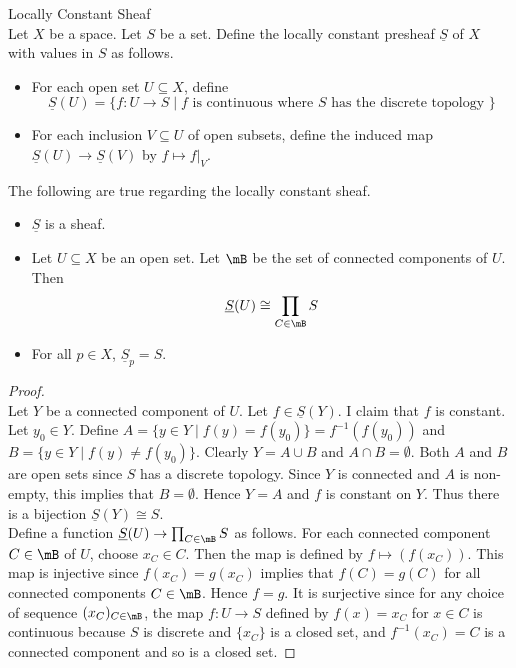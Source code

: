 \documentclass[a4paper]{article}
\begin{document}
\begin{eg}{Locally Constant Sheaf}{}\\
Let $X$ be a space. Let $S$ be a set. Define the locally constant presheaf $\underline{S}$ of $X$ with values in $S$ as follows. 
\begin{itemize}
\item For each open set $U\subseteq X$, define $$\underline{S}(U)=\{f:U\to S\;|\;f\text{ is continuous where }S\text{ has the discrete topology }\}$$
\item For each inclusion $V\subseteq U$ of open subsets, define the induced map $\underline{S}(U)\to\underline{S}(V)$ by $f\mapsto f|_V$. 
\end{itemize}
The following are true regarding the locally constant sheaf. 
\begin{itemize}
\item $\underline{S}$ is a sheaf. 
\item Let $U\subseteq X$ be an open set. Let $\mB$ be the set of connected components of $U$. Then $$\underline{S}(U)\cong\prod_{C\in\mB}S$$
\item For all $p\in X$, $\underline{S}_p=S$. 
\end{itemize}
\begin{proof}\\
Let $Y$ be a connected component of $U$. Let $f\in\underline{S}(Y)$. I claim that $f$ is constant. Let $y_0\in Y$. Define $A=\{y\in Y\;|\;f(y)=f(y_0)\}=f^{-1}(f(y_0))$ and $B=\{y\in Y\;|\;f(y)\neq f(y_0)\}$. Clearly $Y=A\cup B$ and $A\cap B=\emptyset$. Both $A$ and $B$ are open sets since $S$ has a discrete topology. Since $Y$ is connected and $A$ is non-empty, this implies that $B=\emptyset$. Hence $Y=A$ and $f$ is constant on $Y$. Thus there is a bijection $\underline{S}(Y)\cong S$. \\

Define a function $\underline{S}(U)\to\prod_{C\in\mB}S$ as follows. For each connected component $C\in\mB$ of $U$, choose $x_C\in C$. Then the map is defined by $f\mapsto(f(x_C))$. This map is injective since $f(x_C)=g(x_C)$ implies that $f(C)=g(C)$ for all connected components $C\in\mB$. Hence $f=g$. It is surjective since for any choice of sequence $(x_C)_{C\in\mB}$, the map $f:U\to S$ defined by $f(x)=x_C$ for $x\in C$ is continuous because $S$ is discrete and $\{x_C\}$ is a closed set, and $f^{-1}(x_C)=C$ is a connected component and so is a closed set. 
\end{proof}
\end{eg}
\end{document}
